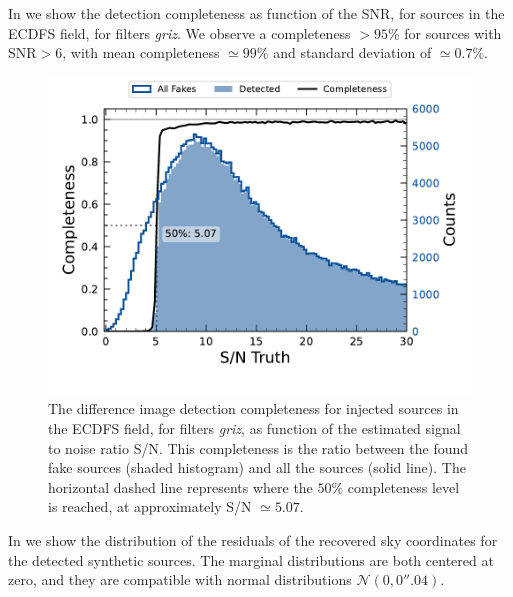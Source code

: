 In  we show the detection completeness as function of the \gls{SNR}, for sources in the ECDFS field, for filters \textit{griz}. We observe a completeness $>95\%$ for sources with \gls{SNR}$> 6$, with mean completeness $\simeq 99\%$ and standard deviation of $\simeq 0.7\%$.
%
\begin{figure}[htb!]
\centering
\includegraphics[width=0.98\linewidth]{figures/efficiency_snr_griz.pdf}
\caption{The difference image detection completeness for injected sources in the ECDFS field, for filters \textit{griz}, as function of the estimated signal to noise ratio S/N. This completeness is the ratio between the found fake sources (shaded histogram) and all the sources (solid line). The horizontal dashed line represents where the $50\%$ completeness level is reached, at approximately S/N $\simeq 5.07$.}
\label{fig:eff_snr_griz}
\vspace{0.1cm}
\end{figure}
%
In  we show the distribution of the residuals of the recovered sky coordinates for the detected synthetic sources. The marginal distributions are both centered at zero, and they are compatible with normal distributions $\mathcal{N}(0, 0''.04)$.
%
